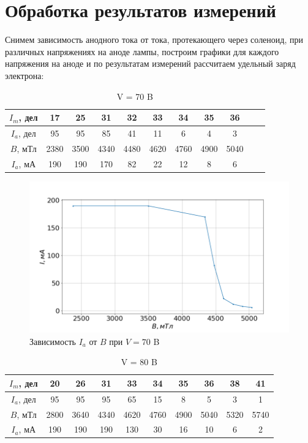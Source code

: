 \documentclass[a4paper, fontsize=14pt]{article}
\begin{document}
\section*{Обработка результатов измерений}
Снимем зависимость анодного тока от тока, протекающего через соленоид, при различных напряжениях на аноде лампы, построим графики для каждого напряжения на аноде и по результатам измерений рассчитаем удельный заряд электрона:
\begin{table}[H]

	\centering
	\begin{tabular}{|c|c|c|c|c|c|c|c|c|c|c|}
     \hline
     $I_m$, дел &	17 &	25 &	31 &	32 &	33&	34&	35&	36\\ \hline
     $I_a$, дел &	95 &	95&	85&	41&	11&	6&	4&	3 \\ \hline
     $B$, мТл&	2380&	3500&	4340&	4480&	4620&	4760&	4900&	5040\\ \hline
$I_a$, мА 	&190&	190&	170&	82&	22&	12&	8&	6\\ \hline

\end{tabular}	
	\caption{V = 70 B}
\end{table}

\begin{figure}[H]
\center
\includegraphics[scale=0.4]{1.png}
\caption{Зависимость $I_a$ от $B$ при $V = 70$ B}
\end{figure}

\begin{table}[H]

	\centering
	\begin{tabular}{|c|c|c|c|c|c|c|c|c|c|}
     \hline
     $I_m$, дел &	20&	26	&31&	33&	34&	35&	36&	38&	41
\\ \hline
     $I_a$, дел &	95&	95&	95&	65&	15&	8	&5&	3&	1
\\ \hline
     $B$, мТл& 2800&	3640	&4340&	4620&	4760&	4900&	5040&	5320&	5740
\\ \hline
$I_a$, мА & 190&	190&	190&	130&	30&	16&	10&	6&	2
\\ \hline

\end{tabular}
	\caption{V = 80 B}
\end{table}
\end{document}
